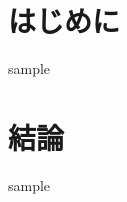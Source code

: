 \documentclass[a4j, 11pt, twocolumn, uplatex]{jsarticle}
\begin{document}

\section{はじめに}
sample

\section{結論}
sample
\end{document}
